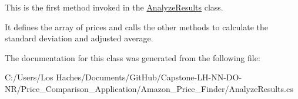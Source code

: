 This is the first method invoked in the \hyperlink{class_price___comparison_1_1_analyze_results}{Analyze\-Results} class. 

It defines the array of prices and calls the other methods to calculate the standard deviation and adjusted average. 

The documentation for this class was generated from the following file\-:\begin{DoxyCompactItemize}
\item 
C\-:/\-Users/\-Los Haches/\-Documents/\-Git\-Hub/\-Capstone-\/\-L\-H-\/\-N\-N-\/\-D\-O-\/\-N\-R/\-Price\-\_\-\-Comparison\-\_\-\-Application/\-Amazon\-\_\-\-Price\-\_\-\-Finder/Analyze\-Results.\-cs\end{DoxyCompactItemize}
